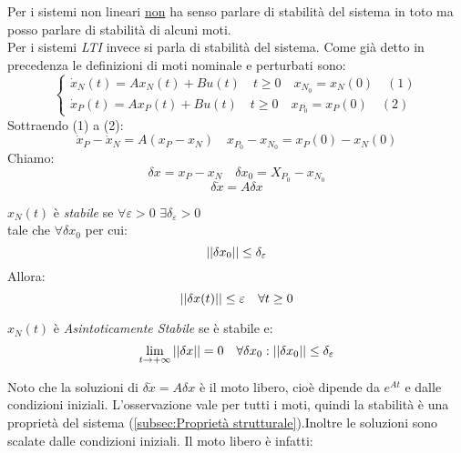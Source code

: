 	Per i sistemi non lineari \underline{non} ha senso parlare di stabilità del sistema in toto ma posso parlare di stabilità di alcuni moti.\\
	Per i sistemi \emph{LTI} invece si parla di stabilità del sistema. Come già detto in precedenza le definizioni di moti nominale e perturbati sono:
	\begin{equation*}
		\begin{cases}
			\dot{x}_N(t) = Ax_N(t)+ Bu(t) \quad t \geq0 \quad x_{N_0} = x_N(0) \quad (1)\\
			\dot{x}_P(t) = Ax_P(t)+ Bu(t) \quad t \geq0 \quad x_{P_0} = x_P(0) \quad (2)
		\end{cases}
	\end{equation*}
	Sottraendo (1) a (2):
	\begin{equation*}
		\dot{x}_P -\dot{x}_N = A(x_P-x_N)\quad x_{P_0}-x_{N_0} = x_P(0)-x_N(0) 
	\end{equation*}
	Chiamo:
	\[
	\delta x = x_P -x_N \quad\delta x_0 = X_{P_0} - x_{N_0}
	\]
	\[
	\boxed{	\delta \dot{x} = A\delta x}
	\]
	\begin{table}[H]
		\centering
		\begin{minipage}[t]{0.4\textwidth}
			$ x_N(t) $ è \emph{stabile} se $ \forall\varepsilon>0\,\, \exists \delta_\varepsilon>0$ \\tale che $ \forall\delta x_0 $ per cui:\[||\delta x_0||\leq\delta_\varepsilon\]
			Allora:\[||\delta x(t)||\leq\varepsilon\quad\forall t\geq 0\]
		\end{minipage}
		\vline
		\hspace{2ex}
		\begin{minipage}[t]{0.4\textwidth}
			$ x_N(t) $ è \emph{Asintoticamente Stabile} se è stabile e:
			\[\lim_{t\to+\infty}||\delta x|| = 0 \quad \forall\delta x_0 : ||\delta x_0 ||\leq\delta_\varepsilon\]
		\end{minipage}
		
	\end{table}
	Noto che la soluzioni di $ \delta\dot{x} = A\delta x $ è il moto libero, cioè dipende da $ e^{At} $ e dalle condizioni iniziali. L'osservazione vale per tutti i moti, quindi la stabilità è una proprietà del sistema (\cref*{subsec:Proprietà strutturale}).Inoltre le soluzioni sono scalate dalle condizioni iniziali. Il moto libero è infatti:\\
